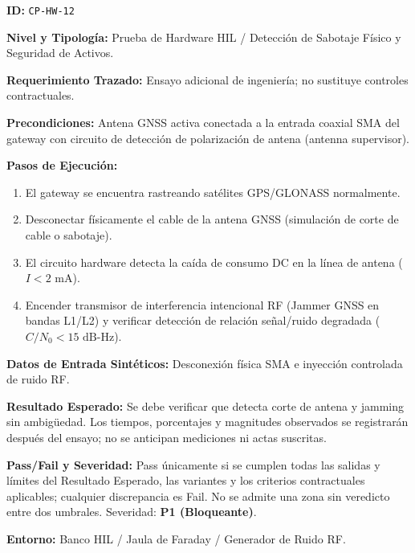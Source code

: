 \par\noindent\textbf{ID:} \texttt{C\allowbreak{}P\allowbreak{}-\allowbreak{}H\allowbreak{}W\allowbreak{}-\allowbreak{}1\allowbreak{}2\allowbreak{}}\par
\par\noindent\textbf{Nivel y Tipología:} Prueba de Hardware HIL / Detección de Sabotaje Físico y Seguridad de Activos.\par
\par\noindent\textbf{Requerimiento Trazado:} Ensayo adicional de ingeniería; no sustituye controles contractuales.\par
\par\noindent\textbf{Precondiciones:} Antena GNSS activa conectada a la entrada coaxial SMA del gateway con circuito de detección de polarización de antena (antenna supervisor).\par
\par\noindent\textbf{Pasos de Ejecución:} \par
\begin{enumerate}
\item El gateway se encuentra rastreando satélites GPS/GLONASS normalmente.
\item Desconectar físicamente el cable de la antena GNSS (simulación de corte de cable o sabotaje).
\item El circuito hardware detecta la caída de consumo DC en la línea de antena (\(I < 2\text{ mA}\)).
\item Encender transmisor de interferencia intencional RF (Jammer GNSS en bandas L1/L2) y verificar detección de relación señal/ruido degradada (\(C/N_0 < 15\text{ dB-Hz}\)).
\end{enumerate}
\par\noindent\textbf{Datos de Entrada Sintéticos:} Desconexión física SMA e inyección controlada de ruido RF.\par
\par\noindent\textbf{Resultado Esperado:} Se debe verificar que detecta corte de antena y jamming sin ambigüedad. Los tiempos, porcentajes y magnitudes observados se registrarán después del ensayo; no se anticipan mediciones ni actas suscritas.\par
\par\noindent\textbf{Pass/Fail y Severidad:} Pass únicamente si se cumplen todas las salidas y límites del Resultado Esperado, las variantes y los criterios contractuales aplicables; cualquier discrepancia es Fail. No se admite una zona sin veredicto entre dos umbrales. Severidad: \textbf{P1 (Bloqueante)}.\par
\par\noindent\textbf{Entorno:} Banco HIL / Jaula de Faraday / Generador de Ruido RF.\par






